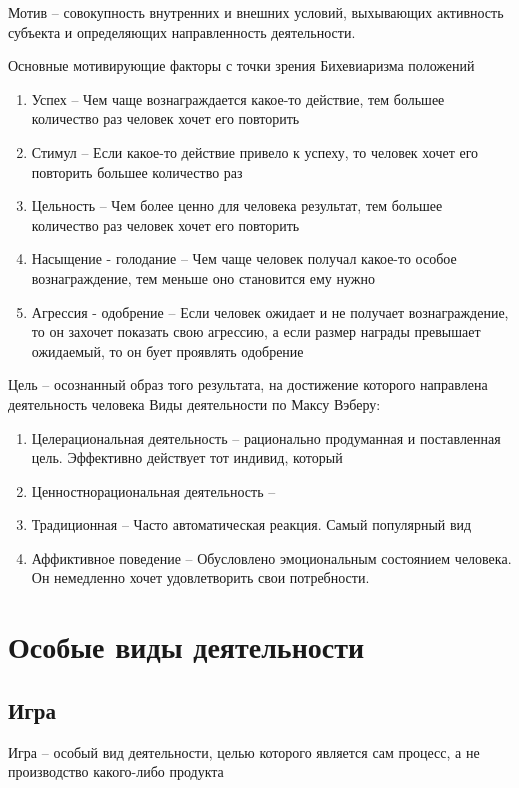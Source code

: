 \documentclass[12pt,a4paper]{book}
\begin{document}
Мотив -- совокупность внутренних и внешних условий, выхывающих активность субъекта и определяющих направленность деятельности.

Основные мотивирующие факторы с точки зрения Бихевиаризма положений
\begin{enumerate}
	\item Успех -- Чем чаще вознаграждается какое-то действие, тем большее количество раз человек хочет его повторить
	\item Стимул -- Если какое-то действие привело к успеху, то человек хочет его повторить большее количество раз
	\item Цельность -- Чем более ценно для человека результат, тем большее количество раз человек хочет его повторить
	\item Насыщение - голодание -- Чем чаще человек получал какое-то особое вознаграждение, тем меньше оно становится ему нужно
	\item Агрессия - одобрение -- Если человек ожидает и не получает вознаграждение, то он захочет показать свою агрессию, а если размер награды превышает ожидаемый, то он бует проявлять одобрение
\end{enumerate}

Цель -- осознанный образ того результата, на достижение которого направлена деятельность человека
Виды деятельности по Максу Вэберу:
\begin{enumerate}
	\item Целерациональная деятельность -- рационально продуманная и поставленная цель. Эффективно действует тот индивид, который 
	\item Ценностнорациональная деятельность -- 
	\item Традиционная -- Часто автоматическая реакция. Самый популярный вид
	\item Аффиктивное поведение -- Обусловлено эмоциональным состоянием человека. Он немедленно хочет удовлетворить свои потребности.
\end{enumerate}

\section{Особые виды деятельности}
\subsection{Игра}

Игра -- особый вид деятельности, целью которого является сам процесс, а не производство какого-либо продукта
	
\end{document}
